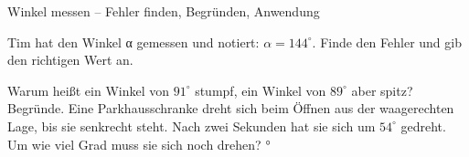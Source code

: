 \begin{aufgabe}{Winkel messen – Fehler finden, Begründen, Anwendung}
\begin{teile}
\teil Tim hat den Winkel α gemessen und notiert: $\alpha = 144^\circ$. Finde den Fehler und gib den richtigen Wert an.

\teil Warum heißt ein Winkel von $91^\circ$ stumpf, ein Winkel von $89^\circ$ aber spitz? Begründe.
\teil Eine Parkhausschranke dreht sich beim Öffnen aus der waagerechten Lage, bis sie senkrecht steht. Nach zwei Sekunden hat sie sich um $54^\circ$ gedreht. Um wie viel Grad muss sie sich noch drehen? \leerfeld °
\end{teile}
\end{aufgabe}
